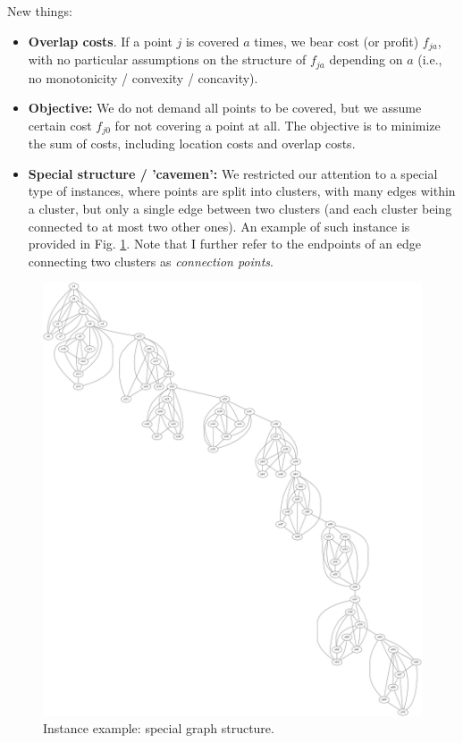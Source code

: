 \documentclass[11pt]{article}
\begin{document}
New things:
\begin{itemize}
\item \textbf{Overlap costs}. If a point \(j\) is covered \(a\) times, we bear cost (or profit)
\(f_{ja}\), with no particular assumptions on the structure of \(f_{ja}\)
depending on \(a\) (i.e., no monotonicity / convexity / concavity).
\item \textbf{Objective:} We do not demand all points to be covered, but we assume certain cost \(f_{j0}\)
for not covering a point at all. The objective is to minimize the sum of
costs, including location costs and overlap costs.
\item \textbf{Special structure / 'cavemen':} We restricted our attention to a special type
of instances, where points are split into clusters, with many edges within a
cluster, but only a single edge between two clusters (and each cluster being
connected to at most two other ones). An example of such instance is provided
in Fig. \ref{fig:ex-inst}. Note that I further refer to the endpoints of an edge
connecting two clusters as \emph{connection points}.
\end{itemize}

\begin{figure}[htbp]
\centering
\includegraphics[width=\textwidth]{./ex-inst.png}
\caption{\label{fig:ex-inst}Instance example: special graph structure.}
\end{figure}
\end{document}
